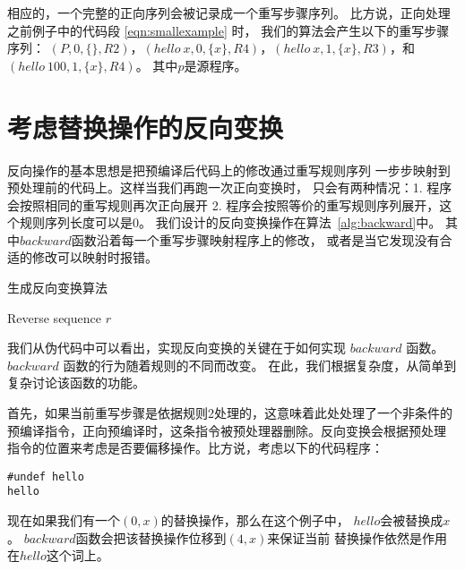 相应的，一个完整的正向序列会被记录成一个重写步骤序列。
比方说，正向处理之前例子中的代码段 \ref{eqn:smallexample} 时，
我们的算法会产生以下的重写步骤序列：
$(P, 0, \{\}, R2)$，$(hello\ x, 0, \{x\}, R4)$，$(hello\ x, 1, \{x\}, R3)$，和
$(hello\ 100, 1, \{x\}, R4)$。
其中$p$是源程序。





\section{考虑替换操作的反向变换}\label{sec:backward}
反向操作的基本思想是把预编译后代码上的修改通过重写规则序列
一步步映射到预处理前的代码上。这样当我们再跑一次正向变换时，
只会有两种情况：1. 程序会按照相同的重写规则再次正向展开
2. 程序会按照等价的重写规则序列展开，这个规则序列长度可以是0。
我们设计的反向变换操作在算法~\ref{alg:backward}中。
其中$backward$函数沿着每一个重写步骤映射程序上的修改，
或者是当它发现没有合适的修改可以映射时报错。

\begin{algorithm}
  \newcommand\mycommfont[1]{\rmfamily{#1}}
  \caption{生成反向变换算法 \label{alg:backward}}
  Reverse sequence $r$\;
  \;
\end{algorithm}

我们从伪代码中可以看出，实现反向变换的关键在于如何实现 $backward$ 函数。
$backward$ 函数的行为随着规则的不同而改变。
在此，我们根据复杂度，从简单到复杂讨论该函数的功能。

首先，如果当前重写步骤是依据规则2处理的，这意味着此处处理了一个非条件的
预编译指令，正向预编译时，这条指令被预处理器删除。反向变换会根据预处理
指令的位置来考虑是否要偏移操作。比方说，考虑以下的代码程序：
\begin{lstlisting}
#undef hello
hello
\end{lstlisting}
现在如果我们有一个$(0, x)$的替换操作，那么在这个例子中，
$hello$会被替换成$x$。
$backward$函数会把该替换操作位移到$(4, x)$来保证当前
替换操作依然是作用在$hello$这个词上。

